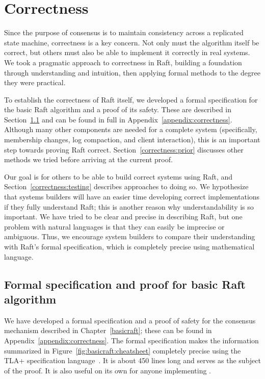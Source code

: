 \chapter{Correctness}
\label{correctness}

Since the purpose of consensus is to maintain consistency across a
replicated state machine, correctness is a key concern. Not only must
the algorithm itself be correct, but others must also be able to
implement it correctly in real systems. We took a pragmatic approach to
correctness in Raft, building a foundation through understanding and
intuition, then applying formal methods to the degree they were
practical.

To establish the correctness of Raft itself, we developed a formal
specification for the basic Raft algorithm and a proof of its safety.
These are described in Section~\ref{correctness:specproof} and can be
found in full in Appendix~\ref{appendix:correctness}. Although many
other components are needed for a complete system (specifically,
membership changes, log compaction, and client interaction), this is an
important step towards proving Raft correct.
Section~\ref{correctness:prior} discusses other methods we tried before
arriving at the current proof.

Our goal is for others to be able to build correct systems using Raft,
and Section~\ref{correctness:testing} describes approaches to doing so.
We hypothesize that systems builders will have an easier time developing
correct implementations if they fully understand Raft; this is another
reason why understandability is so important. We have tried to be clear
and precise in describing Raft, but one problem with natural languages
is that they can easily be imprecise or ambiguous. Thus, we encourage
system builders to compare their understanding with Raft's formal
specification, which is completely precise using mathematical language.

\section{Formal specification and proof for basic Raft algorithm}
\label{correctness:specproof}

We have developed a formal specification and a proof of safety for the
consensus mechanism described in Chapter~\ref{basicraft}; these can be
found in Appendix~\ref{appendix:correctness}.
The formal specification makes the information summarized in
Figure~\ref{fig:basicraft:cheatsheet} completely precise using the TLA+
specification language~\cite{Lamport:2002}. It is about \num{450} lines long
and serves as the subject of the proof.
It is also useful on its own for anyone implementing
\name{}.

